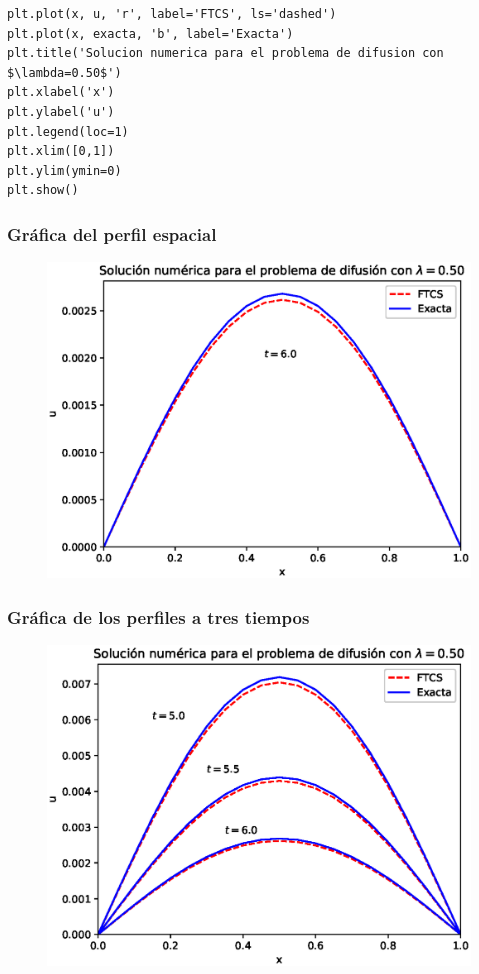 \documentclass[12pt]{beamer}
\begin{document}
{\begin{frame}
\begin{lstlisting}[caption=Programa principal para el ejercicio, style=FormattedNumber, basicstyle=\linespread{1.1}\ttfamily=\small, columns=fullflexible]
plt.plot(x, u, 'r', label='FTCS', ls='dashed')
plt.plot(x, exacta, 'b', label='Exacta')
plt.title('Solucion numerica para el problema de difusion con $\lambda=0.50$')
plt.xlabel('x')
plt.ylabel('u')
plt.legend(loc=1)
plt.xlim([0,1])
plt.ylim(ymin=0)
plt.show()
\end{lstlisting}
\end{frame}
\begin{frame}
\frametitle{Gráfica del perfil espacial}
\begin{figure}
	\centering
	\includegraphics[scale=0.6]{Imagenes/solucionFTSC_01.eps}
\end{figure}
\end{frame}
\begin{frame}
\frametitle{Gráfica de los perfiles a tres tiempos}
\begin{figure}
	\centering
	\includegraphics[scale=0.6]{Imagenes/solucionFTSC_02.eps}
\end{figure}
\end{frame}
}
\end{document}
